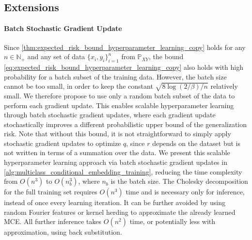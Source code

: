 \documentclass{llncs}
\begin{document}
	\subsection{Extensions}
	\label{sec:extensions}
	
	\paragraph{Batch Stochastic Gradient Update} Since \cref{thm:expected_risk_bound_hyperparameter_learning_copy} holds for any $n \in \mathbb{N}_{+}$ and any set of data $\{x_{i}, y_{i}\}_{i = 1}^{n}$ from $\mathbb{P}_{X Y}$, the bound \eqref{eq:expected_risk_bound_hyperparameter_learning_copy} also holds with high probability for a batch subset of the training data. However, the batch size cannot be too small, in order to keep the constant $\sqrt{8 \log{(2 / \beta)} / n}$ relatively small. We therefore propose to use only a random batch subset of the data to perform each gradient update. This enables scalable hyperparameter learning through batch stochastic gradient updates, where each gradient update stochastically improves a different probabilistic upper bound of the generalization risk. Note that without this bound, it is not straightforward to simply apply stochastic gradient updates to optimize $q$, since $r$ depends on the dataset but is not written in terms of a summation over the data. We present this scalable hyperparameter learning approach via batch stochastic gradient updates in \cref{alg:multiclass_conditional_embedding_training}, reducing the time complexity from $O(n^{3})$ to $O(n_{b}^{3})$, where $n_{b}$ is the batch size. The Cholesky decomposition for the full training set requires $O(n^{3})$ time and is necessary only for inference, instead of once every learning iteration. It can be further avoided by using random Fourier features \citep{rahimi2008random} or kernel herding \citep{chen2010super} to approximate the already learned \gls{MCE}. All further inference takes $O(n^{2})$ time, or potentially less with approximation, using back substitution. 
	
\end{document}
